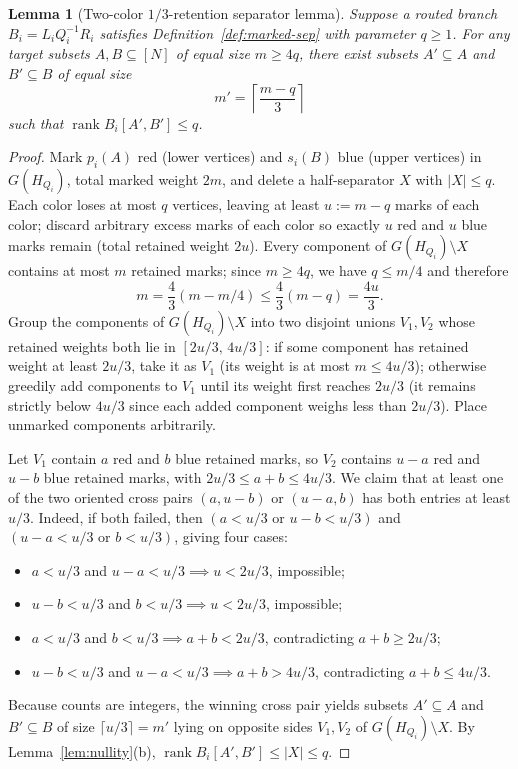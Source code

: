 \documentclass[11pt,reqno]{amsart}
\numberwithin{equation}{section}
\newtheorem{lemma}[theorem]{Lemma}
\theoremstyle{definition}
\theoremstyle{remark}
\newcommand{\rank}{\operatorname{rank}}
\begin{document}
\begin{lemma}[Two-color $1/3$-retention separator lemma]
\label{lem:two-color}
Suppose a routed branch $B_i = L_i Q_i^{-1} R_i$ satisfies Definition~\ref{def:marked-sep} with parameter $q\ge 1$. For any target subsets $A,B\subseteq[N]$ of equal size $m\ge 4q$, there exist subsets $A'\subseteq A$ and $B'\subseteq B$ of equal size
\begin{equation}
\label{eq:third-step}
m' = \left\lceil\frac{m - q}{3}\right\rceil
\end{equation}
such that $\rank B_i[A',B']\le q$.
\end{lemma}

\begin{proof}
Mark $p_i(A)$ red (lower vertices) and $s_i(B)$ blue (upper vertices) in $G(H_{Q_i})$, total marked weight $2m$, and delete a half-separator $X$ with $|X|\le q$. Each color loses at most $q$ vertices, leaving at least $u := m - q$ marks of each color; discard arbitrary excess marks of each color so exactly $u$ red and $u$ blue marks remain (total retained weight $2u$). Every component of $G(H_{Q_i})\setminus X$ contains at most $m$ retained marks; since $m\ge 4q$, we have $q\le m/4$ and therefore
\[
m = \frac{4}{3}(m - m/4) \le \frac{4}{3}(m - q) = \frac{4u}{3}.
\]
Group the components of $G(H_{Q_i})\setminus X$ into two disjoint unions $V_1,V_2$ whose retained weights both lie in $[2u/3,\, 4u/3]$: if some component has retained weight at least $2u/3$, take it as $V_1$ (its weight is at most $m\le 4u/3$); otherwise greedily add components to $V_1$ until its weight first reaches $2u/3$ (it remains strictly below $4u/3$ since each added component weighs less than $2u/3$). Place unmarked components arbitrarily.

Let $V_1$ contain $a$ red and $b$ blue retained marks, so $V_2$ contains $u-a$ red and $u-b$ blue retained marks, with $2u/3\le a+b\le 4u/3$. We claim that at least one of the two oriented cross pairs $(a,u-b)$ or $(u-a,b)$ has both entries at least $u/3$. Indeed, if both failed, then $(a < u/3 \text{ or } u-b < u/3)$ and $(u-a < u/3 \text{ or } b < u/3)$, giving four cases:
\begin{itemize}[leftmargin=1.5em]
\item $a < u/3$ and $u-a < u/3 \implies u < 2u/3$, impossible;
\item $u-b < u/3$ and $b < u/3 \implies u < 2u/3$, impossible;
\item $a < u/3$ and $b < u/3 \implies a+b < 2u/3$, contradicting $a+b\ge 2u/3$;
\item $u-b < u/3$ and $u-a < u/3 \implies a+b > 4u/3$, contradicting $a+b\le 4u/3$.
\end{itemize}
Because counts are integers, the winning cross pair yields subsets $A'\subseteq A$ and $B'\subseteq B$ of size $\lceil u/3\rceil = m'$ lying on opposite sides $V_1,V_2$ of $G(H_{Q_i})\setminus X$. By Lemma~\ref{lem:nullity}(b), $\rank B_i[A',B']\le |X|\le q$.
\end{proof}
\end{document}
